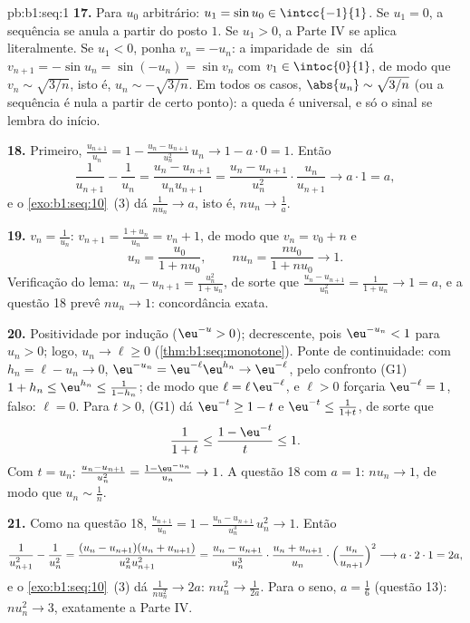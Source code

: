 \begin{solution}{pb:b1:seq:1}
\textbf{17.} Para $u_0$ arbitrário: $u_1 = \sin u_0 \in
\intcc{-1}{1}$. Se $u_1 = 0$, a sequência se anula a partir do posto
$1$. Se $u_1 > 0$, a Parte IV se aplica literalmente. Se $u_1 < 0$, ponha
$v_n = -u_n$: a imparidade de $\sin$ dá $v_{n+1} = -\sin u_n =
\sin(-u_n) = \sin v_n$ com $v_1 \in \intoc{0}{1}$, de modo que $v_n \sim
\sqrt{3/n}$, isto é, $u_n \sim -\sqrt{3/n}$. Em todos os casos,
$\abs{u_n} \sim \sqrt{3/n}$ (ou a sequência é nula a partir de certo ponto):
a queda é universal, e só o sinal se lembra do início.

\textbf{18.} Primeiro, $\frac{u_{n+1}}{u_n} = 1 - \frac{u_n -
u_{n+1}}{u_n^2}\,u_n \to 1 - a \cdot 0 = 1$. Então
\[
\frac{1}{u_{n+1}} - \frac{1}{u_n}
= \frac{u_n - u_{n+1}}{u_n u_{n+1}}
= \frac{u_n - u_{n+1}}{u_n^2}\cdot\frac{u_n}{u_{n+1}}
\longrightarrow a \cdot 1 = a ,
\]
e o \cref{exo:b1:seq:10}~(3) dá $\frac{1}{n u_n} \to a$,
isto é, $n u_n \to \frac1a$.

\textbf{19.} $v_n = \frac{1}{u_n}$: $v_{n+1} = \frac{1 +
u_n}{u_n} = v_n + 1$, de modo que $v_n = v_0 + n$ e
\[
u_n = \frac{u_0}{1 + n u_0} , \qquad
n u_n = \frac{n u_0}{1 + n u_0} \longrightarrow 1 .
\]
Verificação do lema: $u_n - u_{n+1} = \frac{u_n^2}{1 + u_n}$, de sorte que
$\frac{u_n - u_{n+1}}{u_n^2} = \frac{1}{1 + u_n} \to 1 = a$, e a
questão 18 prevê $n u_n \to 1$: concordância exata.

\textbf{20.} Positividade por indução ($\eu^{-u} > 0$);
decrescente, pois $\eu^{-u_n} < 1$ para $u_n > 0$; logo, $u_n \to
\ell \geq 0$ (\cref{thm:b1:seq:monotone}). Ponte de continuidade:
com $h_n = \ell - u_n \to 0$, $\eu^{-u_n} = \eu^{-\ell}
\eu^{h_n} \to \eu^{-\ell}$, pelo confronto (G1) $1 + h_n \leq
\eu^{h_n} \leq \frac{1}{1 - h_n}$; de modo que $\ell = \ell\,
\eu^{-\ell}$, e $\ell > 0$ forçaria $\eu^{-\ell} = 1$,
falso: $\ell = 0$. Para $t > 0$, (G1) dá $\eu^{-t} \geq 1 - t$
e $\eu^{-t} \leq \frac{1}{1 + t}$, de sorte que
\[
\frac{1}{1 + t} \leq \frac{1 - \eu^{-t}}{t} \leq 1 .
\]
Com $t = u_n$: $\frac{u_n - u_{n+1}}{u_n^2} = \frac{1 -
\eu^{-u_n}}{u_n} \to 1$. A questão 18 com $a = 1$: $n u_n \to
1$, de modo que $u_n \sim \frac1n$.

\textbf{21.} Como na questão 18, $\frac{u_{n+1}}{u_n} = 1 -
\frac{u_n - u_{n+1}}{u_n^3}\,u_n^2 \to 1$. Então
\[
\frac{1}{u_{n+1}^2} - \frac{1}{u_n^2}
= \frac{(u_n - u_{n+1})(u_n + u_{n+1})}{u_n^2 u_{n+1}^2}
= \frac{u_n - u_{n+1}}{u_n^3}\cdot
\frac{u_n + u_{n+1}}{u_n}\cdot
\Bigl(\frac{u_n}{u_{n+1}}\Bigr)^2
\longrightarrow a \cdot 2 \cdot 1 = 2a ,
\]
e o \cref{exo:b1:seq:10}~(3) dá $\frac{1}{n u_n^2} \to 2a$:
$n u_n^2 \to \frac{1}{2a}$. Para o seno, $a = \frac16$
(questão 13): $n u_n^2 \to 3$, exatamente a Parte IV.


\end{solution}

